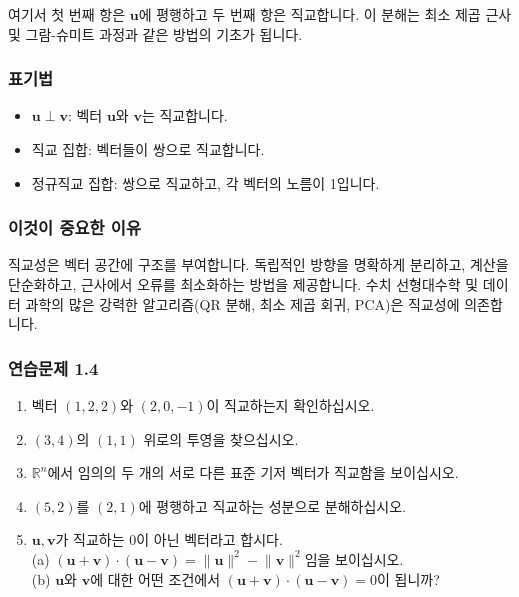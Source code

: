 \documentclass[
  12pt,
  a4paper,
]{article}
\begin{document}
여기서 첫 번째 항은 \(\mathbf{u}\)에 평행하고 두 번째 항은 직교합니다. 이 분해는 최소 제곱 근사 및 그람-슈미트 과정과 같은 방법의 기초가 됩니다.

\subsubsection{표기법}\label{notation-4}

\begin{itemize}
\item
  \(\mathbf{u} \perp \mathbf{v}\): 벡터 \(\mathbf{u}\)와 \(\mathbf{v}\)는 직교합니다.
\item
  직교 집합: 벡터들이 쌍으로 직교합니다.
\item
  정규직교 집합: 쌍으로 직교하고, 각 벡터의 노름이 1입니다.
\end{itemize}

\subsubsection{이것이 중요한 이유}\label{why-this-matters-3}

직교성은 벡터 공간에 구조를 부여합니다. 독립적인 방향을 명확하게 분리하고, 계산을 단순화하고, 근사에서 오류를 최소화하는 방법을 제공합니다. 수치 선형대수학 및 데이터 과학의 많은 강력한 알고리즘(QR 분해, 최소 제곱 회귀, PCA)은 직교성에 의존합니다.

\subsubsection{연습문제 1.4}\label{exercises-14}

\begin{enumerate}
\def\labelenumi{\arabic{enumi}.}
\item
  벡터 \((1,2,2)\)와 \((2,0,-1)\)이 직교하는지 확인하십시오.
\item
  \((3,4)\)의 \((1,1)\) 위로의 투영을 찾으십시오.
\item
  \(\mathbb{R}^n\)에서 임의의 두 개의 서로 다른 표준 기저 벡터가 직교함을 보이십시오.
\item
  \((5,2)\)를 \((2,1)\)에 평행하고 직교하는 성분으로 분해하십시오.
\item
  \(\mathbf{u}, \mathbf{v}\)가 직교하는 0이 아닌 벡터라고 합시다.\\
  (a) \((\mathbf{u}+\mathbf{v})\cdot(\mathbf{u}-\mathbf{v})=\lVert \mathbf{u}\rVert^2-\lVert \mathbf{v}\rVert^2\)임을 보이십시오.\\
  (b) \(\mathbf{u}\)와 \(\mathbf{v}\)에 대한 어떤 조건에서 \((\mathbf{u}+\mathbf{v})\cdot(\mathbf{u}-\mathbf{v})=0\)이 됩니까?
\end{enumerate}
\end{document}

